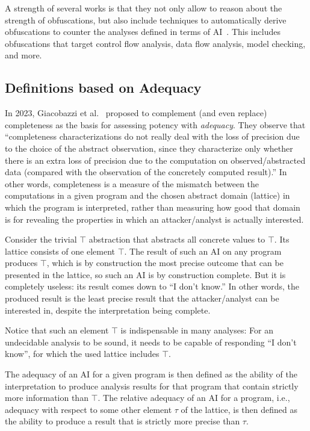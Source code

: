 A strength of several works is that they not only allow to reason about the strength of obfuscations, but also include techniques to automatically derive obfuscations to counter the analyses defined in terms of AI~\cite{mila05a,mila05b,mila07,DP2013,DP2018,Roberto2012}. This includes obfuscations that target control flow analysis, data flow analysis, model checking, and more.

\subsection{Definitions based on Adequacy}
\label{sec:adequacy}
In 2023, Giacobazzi et al.~\cite{fitting_roberto} proposed to complement (and even replace) completeness as the basis for assessing potency with \emph{adequacy}. They observe that ``completeness characterizations do not really deal with the loss of precision due to the choice of the abstract observation, since they characterize only whether there is an extra loss of precision due to the computation on observed/abstracted data (compared with the observation of the concretely computed result).'' In other words, completeness is a measure of the mismatch between the computations in a given program and the chosen abstract domain (lattice) in which the program is interpreted, rather than measuring how good that domain is for revealing the properties in which an attacker/analyst is actually interested. 

Consider the trivial $\top$ abstraction that abstracts all concrete values to $\top$. Its lattice consists of one element $\top$. The result of such an AI on any program produces $\top$, which is by construction the most precise outcome that can be presented in the lattice, so such an AI is by construction complete. But it is completely useless: its result comes down to ``I don't know.'' In other words, the produced result is the least precise result that the attacker/analyst can be interested in, despite the interpretation being complete. 

Notice that such an element $\top$ is indispensable in many analyses: For an undecidable analysis to be sound, it needs to be capable of responding ``I don't know'', for which the used lattice includes $\top$.

The adequacy of an AI for a given program is then defined as the ability of the interpretation to produce analysis results for that program that contain strictly more information than $\top$. The relative adequacy of an AI for a program, i.e., adequacy with respect to some other element $\tau$ of the lattice, is then defined as the ability to produce a result that is strictly more precise than $\tau$.

